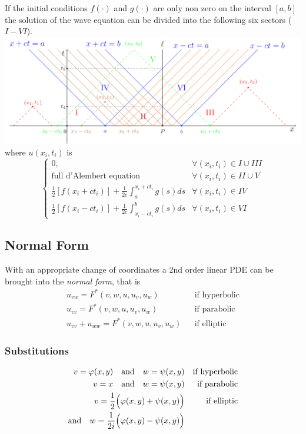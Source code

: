 If the initial conditions $f(\cdot)$ and $g(\cdot)$ are only non zero on the interval $[a,b]$ the solution of the wave equation can be divided into the following six sectors ($I-VI$).
\includegraphics[width=\linewidth]{../images/pde_dAlembert.png}
where $u(x_i,t_i)$ is
\begin{equation*}
    \begin{cases}
        0,                                                                        & \forall (x_i,t_i) \in I \cup III \\
        \text{full d'Alembert equation}                                           & \forall (x_i,t_i) \in II \cup V  \\
        \frac{1}{2}\left[f(x_i+ct_i)\right]+\frac{1}{2c}\int_{a}^{x_i+ct_i}g(s)ds & \forall (x_i,t_i) \in IV         \\
        \frac{1}{2}\left[f(x_i-ct_i)\right]+\frac{1}{2c}\int_{x_i-ct_i}^{b}g(s)ds & \forall (x_i,t_i) \in VI
    \end{cases}
\end{equation*}


\subsection{Normal Form}
With an appropriate change of coordinates a 2nd order linear PDE can be brought into the \textit{normal form}, that is
\begin{align*}
    u_{vw}=F^{*}(v,w,u,u_{v},u_{w})        &  & \text{if hyperbolic} \\
    u_{vv}=F^{*}(v,w,u,u_{v},u_{w})        &  & \text{if parabolic}  \\
    u_{vv}+u_{ww}=F^{*}(v,w,u,u_{v},u_{w}) &  & \text{if elliptic}
\end{align*}

\subsubsection{Substitutions}
\begin{align*}
    v=\varphi(x,y)\quad\text{and}\quad w=\psi(x,y)                   &   & \text{if hyperbolic} \\
    v=x\quad\text{and}\quad w=\psi(x,y)                              &   & \text{if parabolic}  \\
    v=\frac{1}{2}\Bigl(\varphi(x,y)+\psi(x,y)\Bigr)                  &   & \text{if elliptic}   \\
    \text{and}\quad w=\frac{1}{2i}\Bigl(\varphi(x,y)-\psi(x,y)\Bigr) &
\end{align*}

